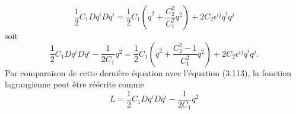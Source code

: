 \documentclass[12pt,a4paper, openany]{report}
\begin{document}
$$\frac{1}{2}C_1Dq^iDq^i=\frac{1}{2}C_1\left(\dot{q}^2+\frac{C^2_2}{C^2_1}q^2\right)+2C_2 \epsilon^{ij} \dot{q}^iq^j $$ 
soit 
\begin{equation}
	\frac{1}{2}C_1Dq^iDq^i-\frac{1}{2C_1}q^2=\frac{1}{2}C_1\left(\dot{q}^2+\frac{C^2_2-1}{C^2_1}q^2\right)+2C_2 \epsilon^{ij}\dot{q}^iq^j . 	
\end{equation} Par comparaison de cette dernière équation avec l'équation (3.113), la fonction lagrangienne peut \^{e}tre réécrite comme 
\begin{equation}
	L= \frac{1}{2}C_1Dq^iDq^i-\frac{1}{2C_1}q^2
\end{equation}
	
	
	
\end{document}
